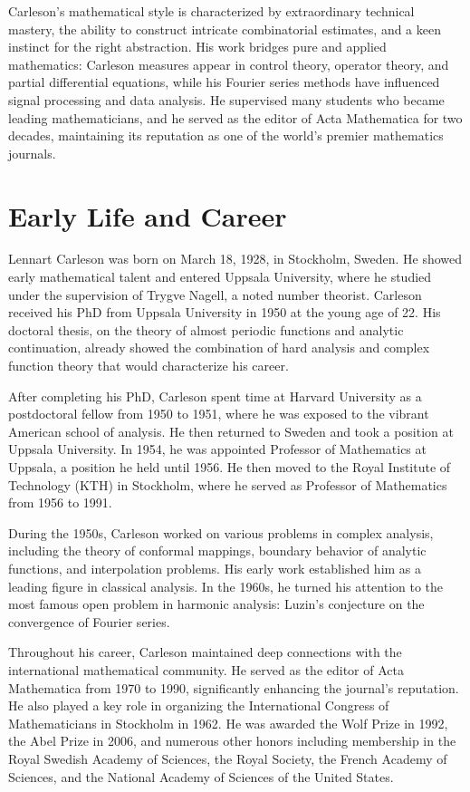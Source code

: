 Carleson's mathematical style is characterized by extraordinary technical mastery, the ability to construct intricate combinatorial estimates, and a keen instinct for the right abstraction. His work bridges pure and applied mathematics: Carleson measures appear in control theory, operator theory, and partial differential equations, while his Fourier series methods have influenced signal processing and data analysis. He supervised many students who became leading mathematicians, and he served as the editor of Acta Mathematica for two decades, maintaining its reputation as one of the world's premier mathematics journals.

\section{Early Life and Career}

Lennart Carleson was born on March 18, 1928, in Stockholm, Sweden. He showed early mathematical talent and entered Uppsala University, where he studied under the supervision of Trygve Nagell, a noted number theorist. Carleson received his PhD from Uppsala University in 1950 at the young age of 22. His doctoral thesis, on the theory of almost periodic functions and analytic continuation, already showed the combination of hard analysis and complex function theory that would characterize his career.

After completing his PhD, Carleson spent time at Harvard University as a postdoctoral fellow from 1950 to 1951, where he was exposed to the vibrant American school of analysis. He then returned to Sweden and took a position at Uppsala University. In 1954, he was appointed Professor of Mathematics at Uppsala, a position he held until 1956. He then moved to the Royal Institute of Technology (KTH) in Stockholm, where he served as Professor of Mathematics from 1956 to 1991.

During the 1950s, Carleson worked on various problems in complex analysis, including the theory of conformal mappings, boundary behavior of analytic functions, and interpolation problems. His early work established him as a leading figure in classical analysis. In the 1960s, he turned his attention to the most famous open problem in harmonic analysis: Luzin's conjecture on the convergence of Fourier series.

Throughout his career, Carleson maintained deep connections with the international mathematical community. He served as the editor of Acta Mathematica from 1970 to 1990, significantly enhancing the journal's reputation. He also played a key role in organizing the International Congress of Mathematicians in Stockholm in 1962. He was awarded the Wolf Prize in 1992, the Abel Prize in 2006, and numerous other honors including membership in the Royal Swedish Academy of Sciences, the Royal Society, the French Academy of Sciences, and the National Academy of Sciences of the United States.

